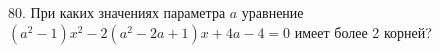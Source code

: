 80. При каких значениях параметра $a$ уравнение $(a^2-1)x^2-2(a^2-2a+1)x+4a-4=0$ имеет более 2 корней?\\
